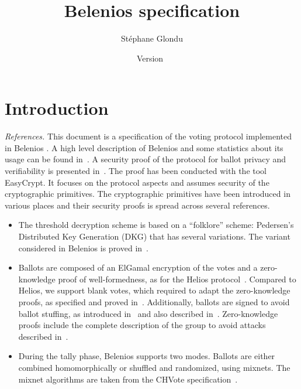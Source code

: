 \documentclass[a4paper]{article}
\title{Belenios specification}
\date{Version~\version}
\author{Stéphane Glondu}
\newcommand{\version}{}
\begin{document}
\maketitle
\tableofcontents

\section{Introduction}
{\it References.}
This document is a specification of the voting protocol implemented in
Belenios \version.
A high level description of Belenios and some statistics about its
usage can be found in~\cite{Belenios-Meadows2019}.
A security proof of the protocol for ballot privacy and verifiability
is presented in~\cite{Belenios-Easycrypt-CSF18}. The proof has been conducted with the
tool EasyCrypt. It focuses on the protocol aspects and assumes
security of the cryptographic primitives.
The cryptographic primitives have been introduced in various places
and their security proofs is spread across several references.
\begin{itemize}
\item
The threshold decryption scheme is
based on a ``folklore'' scheme:
Pedersen’s~\cite{Pedersen} Distributed Key Generation (DKG) that has several variations.
The variant considered in Belenios is proved
in~\cite{Pereira-proofDKG-eprint2024}.
\item Ballots are composed of an ElGamal encryption of the votes and a
  zero-knowledge proof of well-formedness, as for the Helios
  protocol~\cite{Helios}. Compared to Helios, we support blank votes,
  which required to adapt the zero-knowledge proofs, as specified and
  proved in~\cite{note-Pierrick}. Additionally, ballots are signed to
  avoid ballot stuffing, as introduced in~\cite{CGGI-esorics14} and also
  described in~\cite{Belenios-Meadows2019}.
  Zero-knowledge proofs include the complete description of the group
  to avoid attacks described in~\cite{EVoteID20-Belenios}.
  \item During the tally phase, Belenios supports two modes. Ballots are either combined
    homomorphically or shuffled and randomized, using mixnets. The
    mixnet algorithms are taken from the CHVote specification~\cite{CHVote}.
\end{itemize}

\end{document}
